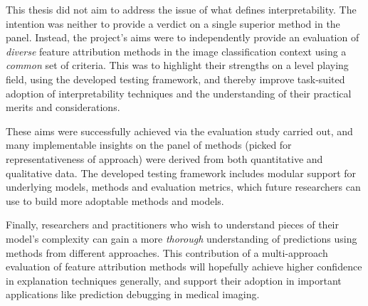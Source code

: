 \documentclass[main]{subfiles}
\begin{document}
This thesis did not aim to address the issue of what defines interpretability. The intention was neither to provide a verdict on a single superior method in the panel. Instead, the project's aims were to independently provide an evaluation of \textit{diverse} feature attribution methods in the image classification context using a \textit{common} set of criteria. This was to highlight their strengths on a level playing field, using the developed testing framework, and thereby improve task-suited adoption of interpretability techniques and the understanding of their practical merits and considerations.

These aims were successfully achieved via the evaluation study carried out, and many implementable insights on the panel of methods (picked for representativeness of approach) were derived from both quantitative and qualitative data. The developed testing framework includes modular support for underlying models, methods and evaluation metrics, which future researchers can use to build more adoptable methods and models.

Finally, researchers and practitioners who wish to understand pieces of their model's complexity can gain a more \textit{thorough} understanding of predictions using methods from different approaches. This contribution of a multi-approach evaluation of feature attribution methods will hopefully achieve higher confidence in explanation techniques generally, and support their adoption in important applications like prediction debugging in medical imaging.
\end{document}
